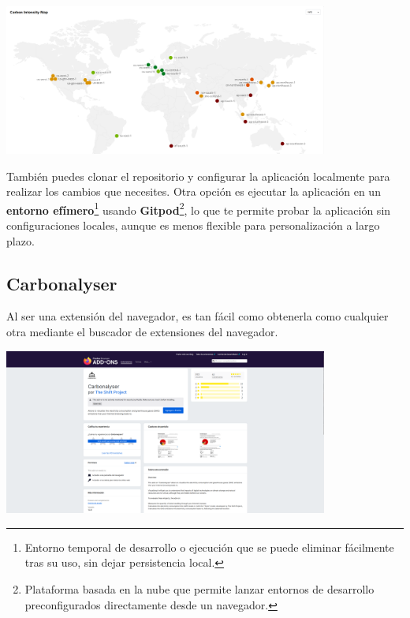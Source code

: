 \documentclass[12pt,a4paper]{report}
\begin{document}
\begin{center}
  \includegraphics[width=0.8\textwidth]{imagenes/CCF_2.png}
\end{center}

También puedes clonar el repositorio y configurar la aplicación localmente para
realizar los cambios que necesites. Otra opción es ejecutar la aplicación en un
\textbf{entorno efímero}\footnote{Entorno temporal de desarrollo o ejecución
  que se puede eliminar fácilmente tras su uso, sin dejar persistencia local.}
usando \textbf{Gitpod}\footnote{Plataforma basada en la nube que permite lanzar
  entornos de desarrollo preconfigurados directamente desde un navegador.}, lo
que te permite probar la aplicación sin configuraciones locales, aunque es
menos flexible para personalización a largo plazo.

\subsection{Carbonalyser}
Al ser una extensión del navegador, es tan fácil como obtenerla como cualquier
otra mediante el buscador de extensiones del navegador.

\begin{center}
  \includegraphics[width=0.8\textwidth]{imagenes/Carbonalyser_1.png}
\end{center}
\end{document}
